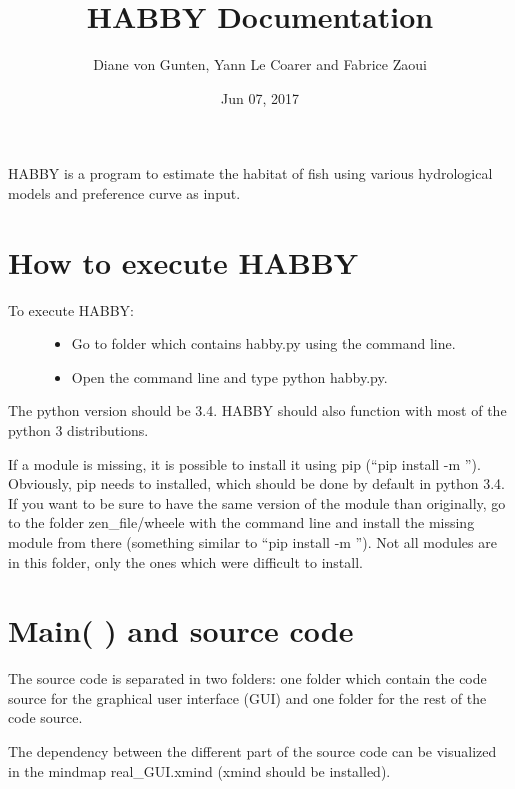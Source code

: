 \documentclass[letterpaper,10pt,english]{sphinxmanual}
\title{HABBY Documentation}
\date{Jun 07, 2017}
\author{Diane von Gunten, Yann Le Coarer and Fabrice Zaoui}
\begin{document}
\maketitle
\sphinxtableofcontents
{}\label{\detokenize{index::doc}}


HABBY is a program to estimate the habitat of fish using various hydrological models and preference curve as input.


\chapter{How to execute HABBY}
\label{\detokenize{index:how-to-execute-habby}}\label{\detokenize{index:welcome-to-habby-s-documentation}}\begin{description}
\item[{To execute HABBY:}] \leavevmode\begin{itemize}
\item {} 
Go to folder which contains habby.py using the command line.

\item {} 
Open the command line and type python habby.py.

\end{itemize}

\end{description}

The python version should be 3.4. HABBY should also function with most of the python 3 distributions.

If a module is missing, it is possible to install it using pip (``pip install -m ''). Obviously, pip needs to installed, which should be done by default in python 3.4. If you want to be sure to have the same version of the module than originally, go to the folder zen\_file/wheele with the command line and install the missing module from there (something similar to ``pip install -m ''). Not all modules are in this folder, only the ones which were difficult to install.


\chapter{Main(   ) and source code}
\label{\detokenize{index:main-and-source-code}}
The source code is separated in two folders: one folder which contain the code source for the graphical user interface (GUI) and one folder for the rest of the code source.

The dependency between the different part of the source code can be visualized in the mindmap real\_GUI.xmind (xmind should be installed).
\end{document}
